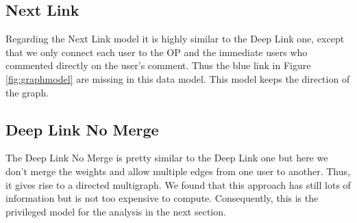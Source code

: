 

\subsection{Next Link}
Regarding the Next Link model it is highly similar to the Deep Link one, except that we only connect each user to the OP and the immediate users who commented directly on the user's comment. Thus the blue link in Figure \ref{fig:graphmodel} are missing in this data model. This model keeps the direction of the graph.

\subsection{Deep Link No Merge}
The Deep Link No Merge is pretty similar to the Deep Link one but here we don't merge the weights and allow multiple edges from one user to another. Thus, it gives rise to a directed multigraph. We found that this approach has still lots of information but is not too expensive to compute. Consequently, this is the privileged model for the analysis in the next section.











